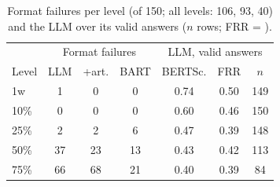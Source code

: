\begin{table}[t]
\centering
\small\setlength{\tabcolsep}{3pt}
\begin{tabular}{lccc|ccc}
\toprule
 & \multicolumn{3}{c|}{Format failures} & \multicolumn{3}{c}{LLM, valid answers} \\
Level & LLM & +art. & BART & BERTSc. & FRR & $n$ \\
\midrule
1w & 1 & 0 & 0 & 0.74 & 0.50 & 149 \\
10\% & 0 & 0 & 0 & 0.60 & 0.46 & 150 \\
25\% & 2 & 2 & 6 & 0.47 & 0.39 & 148 \\
50\% & 37 & 23 & 13 & 0.43 & 0.42 & 113 \\
75\% & 66 & 68 & 21 & 0.40 & 0.39 & 84 \\
\bottomrule
\end{tabular}
\caption{Format failures per level (of 150; all levels: 106, 93, 40) and the LLM over its valid answers ($n$ rows; FRR = \frr{}).}
\label{tab:format}
\end{table}
